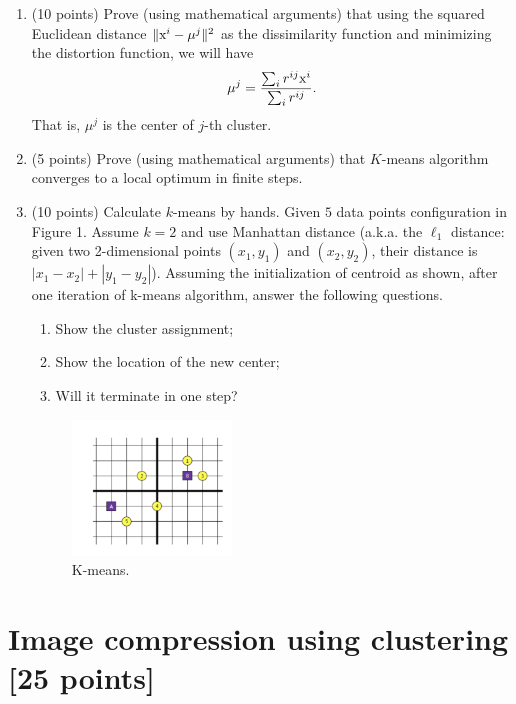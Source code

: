\documentclass[twoside,10pt]{article}
\begin{document}
\begin{enumerate}

\item (10 points) Prove (using mathematical arguments) that using the squared Euclidean distance $\|\text x^i-\mu^j\|^2$ as the dissimilarity function and minimizing the distortion function, we will have 
   $$\mu^j=\frac{\sum_i r^{ij} \text x^i}{\sum_i r^{ij}}.$$
   That is, $\mu^j$ is the center of $j$-th cluster. 

\item (5 points) Prove (using mathematical arguments) that $K$-means algorithm converges to a local optimum in finite steps. 

\item (10 points) Calculate $k$-means by hands.  Given $5$ data points configuration in Figure 1. Assume $k = 2$ and use Manhattan distance (a.k.a. the $\ell_1$ distance: given two 2-dimensional points $(x_1, y_1)$ and $(x_2, y_2)$, their distance is $|x_1 - x_2| + |y_1 - y_2|$).  Assuming the initialization of centroid as shown, after one iteration of k-means algorithm, answer the following questions. 

\begin{enumerate}
\item Show the cluster assignment;
\item Show the location of the new center;
\item Will it terminate in one step?
\end{enumerate}

\begin{figure}[h!]
\begin{center}
\includegraphics[width = 0.4\textwidth]{points.png}
\end{center}
\caption{K-means.}
\end{figure}

\end{enumerate}


\section{Image compression using clustering [25 points]}
\end{document}
